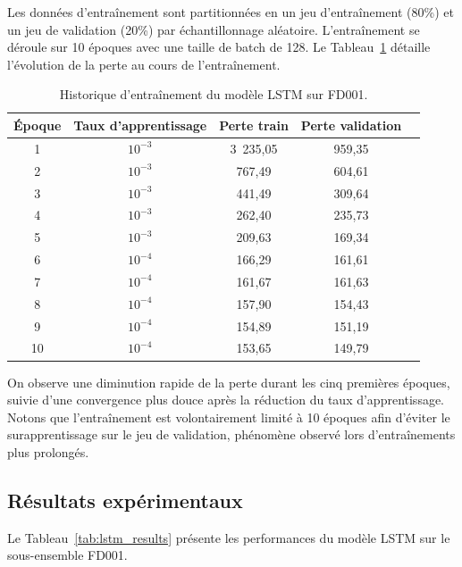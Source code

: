 \documentclass[12pt,a4paper]{report}
\theoremstyle{definition}
\begin{document}
Les données d'entraînement sont partitionnées en un jeu d'entraînement (80\%) et un jeu de validation (20\%) par échantillonnage aléatoire. L'entraînement se déroule sur 10 époques avec une taille de batch de 128. Le Tableau~\ref{tab:lstm_training} détaille l'évolution de la perte au cours de l'entraînement.

\begin{table}[H]
    \centering
    \caption{Historique d'entraînement du modèle LSTM sur FD001.}
    \label{tab:lstm_training}
    \begin{tabular}{ccccc}
        \toprule
        \textbf{Époque} & \textbf{Taux d'apprentissage} & \textbf{Perte train} & \textbf{Perte validation} \\
        \midrule
        1 & $10^{-3}$ & 3~235,05 & 959,35 \\
        2 & $10^{-3}$ & 767,49 & 604,61 \\
        3 & $10^{-3}$ & 441,49 & 309,64 \\
        4 & $10^{-3}$ & 262,40 & 235,73 \\
        5 & $10^{-3}$ & 209,63 & 169,34 \\
        6 & $10^{-4}$ & 166,29 & 161,61 \\
        7 & $10^{-4}$ & 161,67 & 161,63 \\
        8 & $10^{-4}$ & 157,90 & 154,43 \\
        9 & $10^{-4}$ & 154,89 & 151,19 \\
        10 & $10^{-4}$ & 153,65 & 149,79 \\
        \bottomrule
    \end{tabular}
\end{table}

On observe une diminution rapide de la perte durant les cinq premières époques, suivie d'une convergence plus douce après la réduction du taux d'apprentissage. Notons que l'entraînement est volontairement limité à 10 époques afin d'éviter le surapprentissage sur le jeu de validation, phénomène observé lors d'entraînements plus prolongés.

\subsection{Résultats expérimentaux}

Le Tableau~\ref{tab:lstm_results} présente les performances du modèle LSTM sur le sous-ensemble FD001.
\end{document}
